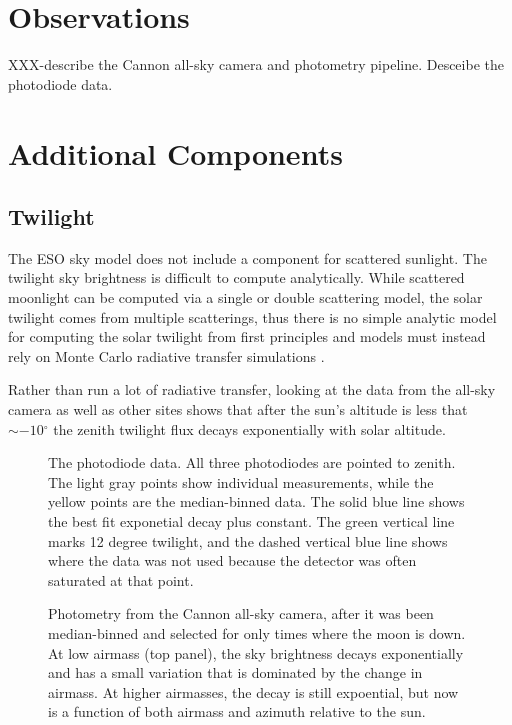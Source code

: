 \documentclass{emulateapj}  %
\newcommand\degree{{^\circ}}
\begin{document}
\section{Observations}

XXX-describe the Cannon all-sky camera and photometry pipeline. Desceibe the photodiode data.  


\section{Additional Components}
\subsection{Twilight}

The ESO sky model does not include a component for scattered sunlight.  The twilight sky brightness is difficult to compute analytically.  While scattered moonlight can be computed via a single or double scattering model, the solar twilight comes from multiple scatterings, thus there is no simple analytic model for computing the solar twilight from first principles and models must instead rely on Monte Carlo radiative transfer simulations \citep{Patat06}.

Rather than run a lot of radiative transfer, looking at the data from the all-sky camera as well as other sites shows that after the sun's altitude is less that $\sim-10\degree$ the zenith twilight flux decays exponentially with solar altitude.

\begin{figure*}
  \caption{The photodiode data.  All three photodiodes are pointed to zenith. The light gray points show individual measurements, while the yellow points are the median-binned data. The solid blue line shows the best fit exponetial decay plus constant. The green vertical line marks 12 degree twilight, and the dashed vertical blue line shows where the data was not used because the detector was often saturated at that point. \label{diodePlot}}
\end{figure*}


\begin{figure*}
  \caption{Photometry from the Cannon all-sky camera, after it was been median-binned and selected for only times where the moon is down.  At low airmass (top panel), the sky brightness decays exponentially and has a small variation that is dominated by the change in airmass.  At higher airmasses, the decay is still expoential, but now is a function of both airmass and azimuth relative to the sun.}
\end{figure*}
\end{document}
